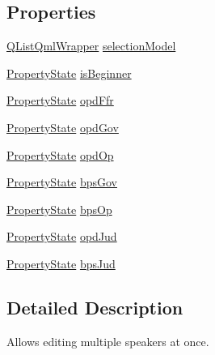 \subsection*{Properties}
\begin{DoxyCompactItemize}
\item 
\hyperlink{classQListQmlWrapper}{Q\-List\-Qml\-Wrapper} \hyperlink{classMixedValueSpeakerModel_a58e2d9f253efcec1338b063636f671c7}{selection\-Model}
\item 
\hyperlink{classMixedValueSpeakerModel_ab53ddbef6944a7444b39801fb4cf07f1}{Property\-State} \hyperlink{classMixedValueSpeakerModel_aa975aa5cc1bc9ce5cf271bdde100956f}{is\-Beginner}
\item 
\hyperlink{classMixedValueSpeakerModel_ab53ddbef6944a7444b39801fb4cf07f1}{Property\-State} \hyperlink{classMixedValueSpeakerModel_ae15c206a56abfba981224678d4b5b275}{opd\-Ffr}
\item 
\hyperlink{classMixedValueSpeakerModel_ab53ddbef6944a7444b39801fb4cf07f1}{Property\-State} \hyperlink{classMixedValueSpeakerModel_a78a4add3e011e2a5b4632f751f9d9b86}{opd\-Gov}
\item 
\hyperlink{classMixedValueSpeakerModel_ab53ddbef6944a7444b39801fb4cf07f1}{Property\-State} \hyperlink{classMixedValueSpeakerModel_a4da92388fbadb9aa5091d80f99078404}{opd\-Op}
\item 
\hyperlink{classMixedValueSpeakerModel_ab53ddbef6944a7444b39801fb4cf07f1}{Property\-State} \hyperlink{classMixedValueSpeakerModel_af0623f60ccedd60ef1ab06718a4edbdb}{bps\-Gov}
\item 
\hyperlink{classMixedValueSpeakerModel_ab53ddbef6944a7444b39801fb4cf07f1}{Property\-State} \hyperlink{classMixedValueSpeakerModel_a0dc7854f44ae909f8908bacb8f93da4c}{bps\-Op}
\item 
\hyperlink{classMixedValueSpeakerModel_ab53ddbef6944a7444b39801fb4cf07f1}{Property\-State} \hyperlink{classMixedValueSpeakerModel_ad7a22ac891701f43d71a0ee50647f41f}{opd\-Jud}
\item 
\hyperlink{classMixedValueSpeakerModel_ab53ddbef6944a7444b39801fb4cf07f1}{Property\-State} \hyperlink{classMixedValueSpeakerModel_aa39c027299f39cdaf188052a41d4dc69}{bps\-Jud}
\end{DoxyCompactItemize}


\subsection{Detailed Description}
Allows editing multiple speakers at once. 

